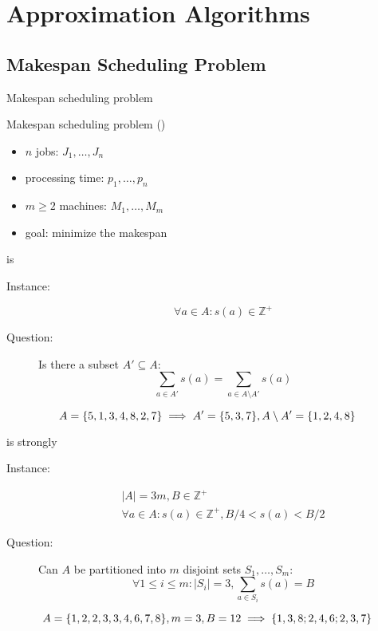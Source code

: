 \section{Approximation Algorithms}

\subsection{Makespan Scheduling Problem}

\begin{frame}{Makespan scheduling problem}
  \begin{exampleblock}{Makespan scheduling problem (\ms{})}
	\begin{itemize}
	  \item $n$ jobs: $J_1, \dots, J_n$
	  \item processing time: $p_1, \dots, p_n$
	  \item $m \ge 2$ machines: $M_1, \dots, M_m$
	 ­\item goal: minimize the makespan
	\end{itemize}
  \end{exampleblock}
\end{frame}
\begin{frame}{\ms{} is \npc{}}
  \begin{definition}[Partition]
	\begin{description}
	  \item[Instance:] 
		\[
		  \forall a \in A: s(a) \in \mathbb{Z}^{+} 
		\]
	  \item[Question:] Is there a subset $A' \subseteq A$: 
		\[
		  \sum_{a \in A'} s(a) = \sum_{a \in A \setminus A'} s(a)
		\]
	\end{description}
  \end{definition}

  \[
	A = \{5,1,3,4,8,2,7\} \implies A' = \{5,3,7\}, A \setminus A' = \{1,2,4,8\}
  \]
\end{frame}
\begin{frame}{\ms{} is strongly \npc{}}
  \begin{definition}[$3$-Partition]
	\begin{description}
	  \item[Instance:] 
		\begin{gather*}
		  |A| = 3m, B \in \mathbb{Z}^{+} \\
		  \forall a \in A: s(a) \in \mathbb{Z}^{+}, B/4 < s(a) < B/2
		\end{gather*}
	  \item[Question:] Can $A$ be partitioned into $m$ disjoint sets $S_1,\dots,S_m$:
		\[
		  \forall 1 \le i \le m: |S_i| = 3, \sum_{a \in S_i} s(a) = B
		\]
	\end{description}
  \end{definition}

  \[
	A = \{1,2,2,3,3,4,6,7,8\}, m = 3, B = 12 \implies \{1,3,8; 2,4,6; 2,3,7\}
  \]
\end{frame}
